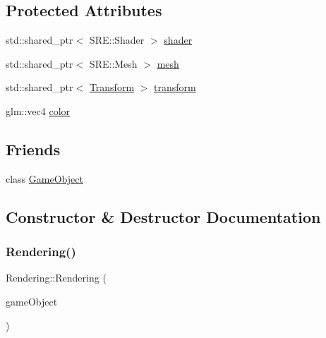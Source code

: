 \subsection*{Protected Attributes}
\begin{DoxyCompactItemize}
\item 
std\+::shared\+\_\+ptr$<$ S\+R\+E\+::\+Shader $>$ \hyperlink{class_mason_1_1_rendering_a32477a9cf3115210280e47e9172ca407}{shader}
\item 
std\+::shared\+\_\+ptr$<$ S\+R\+E\+::\+Mesh $>$ \hyperlink{class_mason_1_1_rendering_a71855a0cbc812640516a7925be451546}{mesh}
\item 
std\+::shared\+\_\+ptr$<$ \hyperlink{class_mason_1_1_transform}{Transform} $>$ \hyperlink{class_mason_1_1_rendering_adaca4d8bb739395f32fc4886653ed2f5}{transform}
\item 
glm\+::vec4 \hyperlink{class_mason_1_1_rendering_a5a78c6260d5111659f1e96888a55bda1}{color}
\end{DoxyCompactItemize}
\subsection*{Friends}
\begin{DoxyCompactItemize}
\item 
class \hyperlink{class_mason_1_1_rendering_a00df87c957d8f7ee0fc51f07a0542f4a}{Game\+Object}
\end{DoxyCompactItemize}


\subsection{Constructor \& Destructor Documentation}
\hypertarget{class_mason_1_1_rendering_abb768ec53a7193e20f8a35d325c0a991}{}\label{class_mason_1_1_rendering_abb768ec53a7193e20f8a35d325c0a991} 
\subsubsection{\texorpdfstring{Rendering()}{Rendering()}}
{\footnotesize\ttfamily Rendering\+::\+Rendering (\begin{DoxyParamCaption}\item[{\hyperlink{class_mason_1_1_game_object}{Game\+Object} $\ast$}]{game\+Object }\end{DoxyParamCaption})\hspace{0.3cm}{\ttfamily [protected]}}



